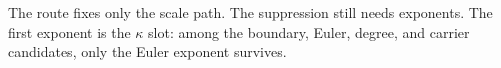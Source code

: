 \documentclass[11pt]{article}
\begin{document}
\begin{code}
\AgdaSymbol{(()}\AgdaSpace{}%
\AgdaOperator{\AgdaInductiveConstructor{,}}\AgdaSpace{}%
\AgdaSymbol{\AgdaUnderscore{})))}\<%
\\
\>[0]\AgdaSpace{}%
\AgdaSpace{}%
\AgdaSymbol{\AgdaUnderscore{}}\AgdaSpace{}%
\AgdaSymbol{=}\AgdaSpace{}%
\<%
\\
\>[0]\AgdaSpace{}%
\AgdaSpace{}%
\AgdaSymbol{(()}\AgdaSpace{}%
\AgdaOperator{\AgdaInductiveConstructor{,}}\AgdaSpace{}%
\AgdaSymbol{\AgdaUnderscore{})}\<%
\end{code}

The route fixes only the scale path.  The suppression still needs exponents.
The first exponent is the $\kappa$ slot: among the boundary, Euler,
degree, and carrier candidates, only the Euler exponent survives.
\end{document}
